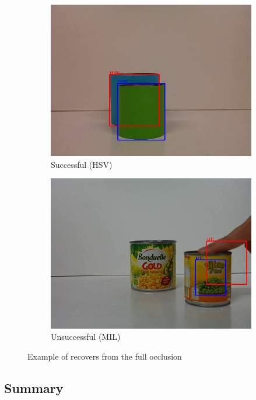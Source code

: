 \begin{figure}
\centering
\begin{subfigure}{0.48\linewidth}
\includegraphics[width=\linewidth]{img/experiments/color-occlusion.png}
\caption{Successful (HSV)}
\end{subfigure}
\begin{subfigure}{0.48\linewidth}
\includegraphics[width=\linewidth]{img/experiments/occlusion.png}
\caption{Unsuccessful (MIL)}
\end{subfigure}
\caption{Example of recovers from the full occlusion}
\label{fig:occlusion}
\end{figure}

\subsection{Summary}

